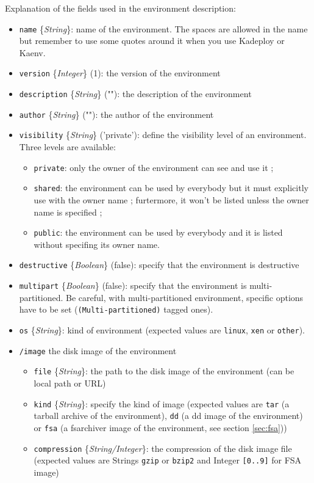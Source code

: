 \documentclass[a4wide,10pt,oneside]{book}
\newcommand{\ypath}[1]{\texttt{#1}}
\newcommand{\yfield}[2]{\texttt{#1} {\small\{{\emph{#2}}\}}:}
\newcommand{\yfieldd}[3]{\texttt{#1} {\small\{{\emph{#2}}\}} {\small(}#3{\small)}:}
\begin{document}
Explanation of the fields used in the environment description:
\begin{itemize}
  \item \yfield{name}{String} name of the environment. The spaces are allowed in the name but remember to use some quotes around it when you use Kadeploy or Kaenv.
  \item \yfieldd{version}{Integer}{1} the version of the environment
  \item \yfieldd{description}{String}{""} the description of the environment
  \item \yfieldd{author}{String}{""} the author of the environment
  \item \yfieldd{visibility}{String}{'private'} define the visibility level of an environment. Three levels are available:
  \begin{itemize}
    \item \texttt{private}: only the owner of the environment can see and use it ;
    \item \texttt{shared}: the environment can be used by everybody but it must explicitly use with the owner name ; furtermore, it won't be listed unless the owner name is specified ;
    \item \texttt{public}: the environment can be used by everybody and it is listed without specifing its owner name.
  \end{itemize}
  \item \yfieldd{destructive}{Boolean}{false} specify that the environment is destructive
  \item \yfieldd{multipart}{Boolean}{false} specify that the environment is multi-partitioned. Be careful, with multi-partitioned environment, specific options have to be set (\texttt{(Multi-partitioned)} tagged ones).
  \item \yfield{os}{String} kind of environment (expected values are \texttt{linux}, \texttt{xen} or \texttt{other}).
  \item \ypath{/image} the disk image of the environment
  \begin{itemize}
    \item \yfield{file}{String} the path to the disk image of the environment (can be local path or URL)
    \item \yfield{kind}{String} specify the kind of image (expected values are \texttt{tar} (a tarball archive of the environment), \texttt{dd} (a dd image of the environment) or \texttt{fsa} (a fsarchiver image of the environment, see section \ref{sec:fsa}))
    \item \yfield{compression}{String/Integer} the compression of the disk image file (expected values are Strings \texttt{gzip} or \texttt{bzip2} and Integer \texttt{[0..9]} for FSA image)

\end{itemize}
\end{itemize}
\end{document}
